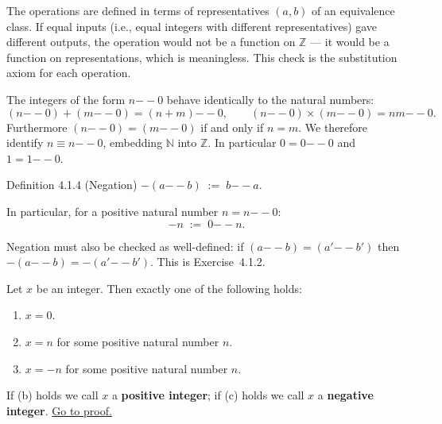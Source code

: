 \begin{remark*}
The operations are defined in terms of representatives $(a, b)$ of an
equivalence class.
If equal inputs (i.e., equal integers with different representatives)
gave different outputs, the operation would not be a function on
$\mathbb{Z}$ --- it would be a function on representations, which is
meaningless.
This check is the substitution axiom for each operation.
\end{remark*}

\begin{remark*}
The integers of the form $n {-\!\!-} 0$ behave identically to the
natural numbers:
\[
(n {-\!\!-} 0) + (m {-\!\!-} 0) = (n+m) {-\!\!-} 0,
\qquad
(n {-\!\!-} 0) \times (m {-\!\!-} 0) = nm {-\!\!-} 0.
\]
Furthermore $(n {-\!\!-} 0) = (m {-\!\!-} 0)$ if and only if $n = m$.
We therefore identify $n \equiv n {-\!\!-} 0$, embedding $\mathbb{N}$
into $\mathbb{Z}$.
In particular $0 = 0 {-\!\!-} 0$ and $1 = 1 {-\!\!-} 0$.
\end{remark*}

\begin{propositionbox}{Definition 4.1.4 (Negation)}
$-(a {-\!\!-} b) \;:=\; b {-\!\!-} a$.

In particular, for a positive natural number $n = n {-\!\!-} 0$:
\[
-n \;:=\; 0 {-\!\!-} n.
\]
\end{propositionbox}

\begin{remark*}
Negation must also be checked as well-defined: if
$(a {-\!\!-} b) = (a' {-\!\!-} b')$ then $-(a {-\!\!-} b) = -(a' {-\!\!-} b')$.
This is Exercise~4.1.2.
\end{remark*}

\begin{lemma}
\label{lem:int-trichotomy}
Let $x$ be an integer. Then exactly one of the following holds:
\begin{enumerate}
  \item[(a)] $x = 0$.
  \item[(b)] $x = n$ for some positive natural number $n$.
  \item[(c)] $x = -n$ for some positive natural number $n$.
\end{enumerate}
If (b) holds we call $x$ a \textbf{positive integer};
if (c) holds we call $x$ a \textbf{negative integer}.
\hyperref[prf:int-trichotomy]{Go to proof.}
\end{lemma}

